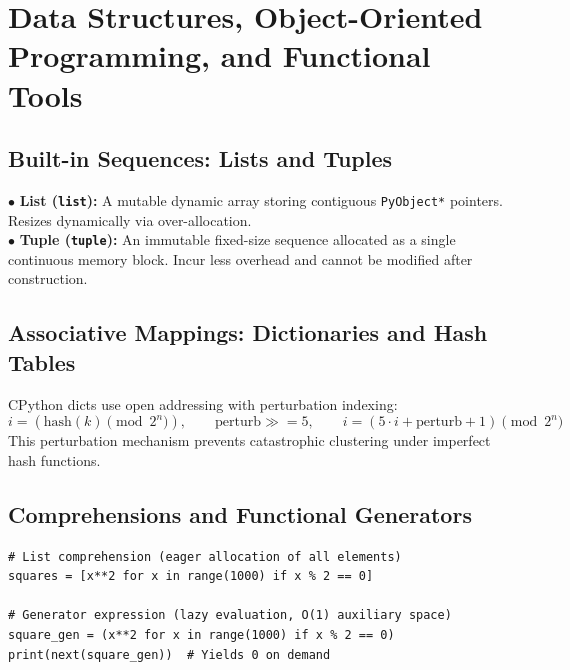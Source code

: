 \chapter{Data Structures, Object-Oriented Programming, and Functional Tools}
\label{chap:data-structures-oop}

\section{Built-in Sequences: Lists and Tuples}
\begin{definition}
$\bullet$ \textbf{List (\texttt{list}):} A mutable dynamic array storing contiguous \texttt{PyObject*} pointers. Resizes dynamically via over-allocation.\\
$\bullet$ \textbf{Tuple (\texttt{tuple}):} An immutable fixed-size sequence allocated as a single continuous memory block. Incur less overhead and cannot be modified after construction.
\end{definition}

\section{Associative Mappings: Dictionaries and Hash Tables}
\begin{keyequation}
CPython dicts use open addressing with perturbation indexing:
\begin{equation}
i = (\text{hash}(k) \pmod{2^n}), \qquad \text{perturb} \gg= 5, \qquad i = (5 \cdot i + \text{perturb} + 1) \pmod{2^n}
\end{equation}
This perturbation mechanism prevents catastrophic clustering under imperfect hash functions.
\end{keyequation}

\section{Comprehensions and Functional Generators}
\begin{lstlisting}
# List comprehension (eager allocation of all elements)
squares = [x**2 for x in range(1000) if x % 2 == 0]

# Generator expression (lazy evaluation, O(1) auxiliary space)
square_gen = (x**2 for x in range(1000) if x % 2 == 0)
print(next(square_gen))  # Yields 0 on demand
\end{lstlisting}

